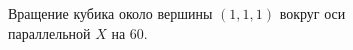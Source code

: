 \documentclass[a5paper, 10pt]{article}
\theoremstyle{definition}
\theoremstyle{plain}
\theoremstyle{remark}
\begin{document}
\begin{figure}[h!]
\caption{Вращение кубика около вершины $(1, 1, 1)$ вокруг оси параллельной $X$ на 60\textdegree.}
\end{figure}
\end{document}
